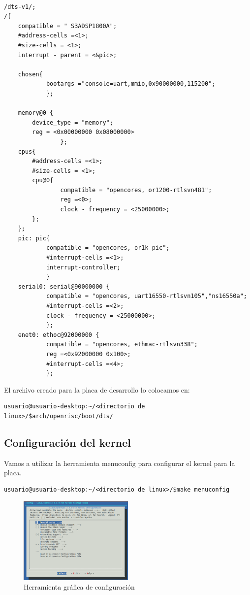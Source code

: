 \begin{lstlisting}[frame=single,caption={Xilinxs3a.dts},label={lst:dts}]

/dts-v1/;
/{
	compatible = " S3ADSP1800A";
	#address-cells =<1>;
	#size-cells = <1>;
	interrupt - parent = <&pic>;
	
	chosen{
			bootargs ="console=uart,mmio,0x90000000,115200";
			};
	
	memory@0 {
		device_type = "memory";
		reg = <0x00000000 0x08000000>
				};
	cpus{
		#address-cells =<1>;
		#size-cells = <1>;
		cpu@0{
				compatible = "opencores, or1200-rtlsvn481";
				reg =<0>;
				clock - frequency = <25000000>;
		};
	};
	pic: pic{
			compatible = "opencores, or1k-pic";
			#interrupt-cells =<1>;
			interrupt-controller;
			}
	serial0: serial@90000000 {
			compatible = "opencores, uart16550-rtlsvn105","ns16550a";
			#interrupt-cells =<2>;
			clock - frequency = <25000000>;
			};
	enet0: ethoc@92000000 {
			compatible = "opencores, ethmac-rtlsvn338";
			reg =<0x92000000 0x100>;
			#interrupt-cells =<4>;
			};
	 \end{lstlisting}

El archivo creado para la placa de desarrollo lo colocamos en: 

\begin{lstlisting}[breaklines]
usuario@usuario-desktop:~/<directorio de linux>/$arch/openrisc/boot/dts/
\end{lstlisting}

\subsection{Configuración del kernel}

Vamos a utilizar la herramienta menuconfig para configurar el kernel para la placa. 

\begin{lstlisting}[breaklines]
usuario@usuario-desktop:~/<directorio de linux>/$make menuconfig
\end{lstlisting}

\begin{figure}[h!]
 \begin{center}
  \includegraphics[width=0.5\textwidth,keepaspectratio=true]{./images/menuconf}
  \caption{Herramienta gráfica de configuración}
 \end{center}
\end{figure}

